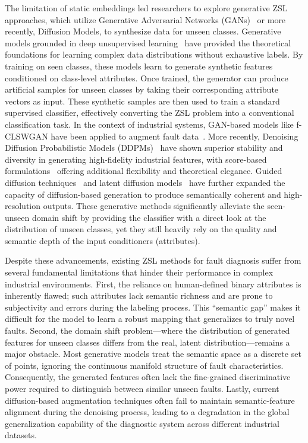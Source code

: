 The limitation of static embeddings led researchers to explore generative ZSL approaches, which utilize Generative Adversarial Networks (GANs)~\cite{goodfellow2014generative} or more recently, Diffusion Models, to synthesize data for unseen classes. Generative models grounded in deep unsupervised learning~\cite{sohl2015deep,kingma2013auto} have provided the theoretical foundations for learning complex data distributions without exhaustive labels. By training on seen classes, these models learn to generate synthetic features conditioned on class-level attributes. Once trained, the generator can produce artificial samples for unseen classes by taking their corresponding attribute vectors as input. These synthetic samples are then used to train a standard supervised classifier, effectively converting the ZSL problem into a conventional classification task. In the context of industrial systems, GAN-based models like f-CLSWGAN have been applied to augment fault data~\cite{chen2024diffusion}. More recently, Denoising Diffusion Probabilistic Models (DDPMs)~\cite{ho2020denoising} have shown superior stability and diversity in generating high-fidelity industrial features, with score-based formulations~\cite{song2020score} offering additional flexibility and theoretical elegance. Guided diffusion techniques~\cite{dhariwal2021diffusion} and latent diffusion models~\cite{rombach2022high} have further expanded the capacity of diffusion-based generation to produce semantically coherent and high-resolution outputs. These generative methods significantly alleviate the seen-unseen domain shift by providing the classifier with a direct look at the distribution of unseen classes, yet they still heavily rely on the quality and semantic depth of the input conditioners (attributes).

Despite these advancements, existing ZSL methods for fault diagnosis suffer from several fundamental limitations that hinder their performance in complex industrial environments. First, the reliance on human-defined binary attributes is inherently flawed; such attributes lack semantic richness and are prone to subjectivity and errors during the labeling process. This ``semantic gap'' makes it difficult for the model to learn a robust mapping that generalizes to truly novel faults. Second, the domain shift problem---where the distribution of generated features for unseen classes differs from the real, latent distribution---remains a major obstacle. Most generative models treat the semantic space as a discrete set of points, ignoring the continuous manifold structure of fault characteristics. Consequently, the generated features often lack the fine-grained discriminative power required to distinguish between similar unseen faults. Lastly, current diffusion-based augmentation techniques often fail to maintain semantic-feature alignment during the denoising process, leading to a degradation in the global generalization capability of the diagnostic system across different industrial datasets.

